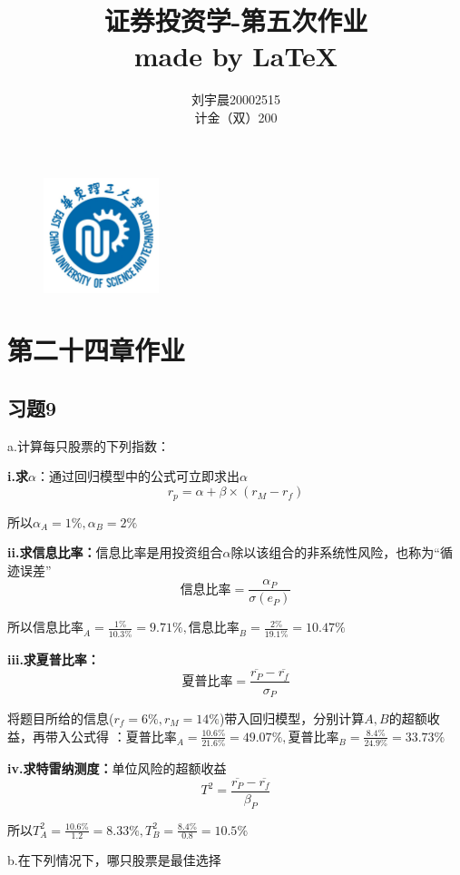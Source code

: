 \documentclass{article}
\title{\Huge 证券投资学-第五次作业    \\\large made by  \LaTeX}
\author{刘宇晨\hspace*{25pt}20002515\\计金（双）200}
\begin{document}
 
\begin{figure}[H]
    \begin{center}
        \includegraphics[width=0.3\textwidth]{logo.jpeg}
        \maketitle
    \end{center}
\end{figure}
\thispagestyle{empty}
\clearpage
{}
\section*{\center 第二十四章作业}
\subsection*{习题9}
a.计算每只股票的下列指数：

\textbf{i.求$\alpha$}：通过回归模型中的公式可立即求出$\alpha$
\[r_p=\alpha+\beta \times (r_M-r_f)\]

所以$\alpha_A=1\%,\alpha_B=2\%$

\textbf{ii.求信息比率：}信息比率是用投资组合$\alpha$除以该组合的非系统性风险，也称为“循迹误差”
\[\text{信息比率}=\frac{\alpha_P}{\sigma (e_P)}\]

所以$\text{信息比率}_A=\frac{1\%}{10.3\%}=9.71\%,\text{信息比率}_B=\frac{2\%}{19.1\%}=10.47\%$

\textbf{iii.求夏普比率：}
\[\text{夏普比率}=\frac{\overline{r_P}-\overline{r_f} }{\sigma_P}\]

将题目所给的信息($r_f=6\%,r_M=14\%$)带入回归模型，分别计算$A,B$的超额收益，再带入公式得
：$\text{夏普比率}_A=\frac{10.6\%}{21.6\%}=49.07\%,\text{夏普比率}_B=\frac{8.4\%}{24.9\%}=33.73\%$

\textbf{iv.求特雷纳测度：}单位风险的超额收益
\[T^2=\frac{\overline{r_P}-\overline{r_f}}{\beta_P}\]

所以$T^2_A=\frac{10.6\%}{1.2}=8.33\%,T^2_B=\frac{8.4\%}{0.8}=10.5\%$

b.在下列情况下，哪只股票是最佳选择
\end{document}
